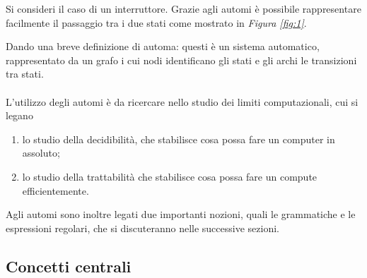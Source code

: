 \documentclass{subfiles}
\begin{document}
Si consideri il caso di un interruttore. Grazie agli automi è possibile rappresentare facilmente il passaggio tra i due stati come mostrato in \emph{Figura \eqref{fig:1}}.
 \label{sec:1}

\noindent Dando una breve definizione di automa: questi è un sistema automatico, rappresentato da un grafo i cui nodi identificano gli stati e gli archi le transizioni tra stati.
\\ \\
L'utilizzo degli automi è da ricercare nello studio dei limiti computazionali, cui si legano
\begin{enumerate}
    \item lo studio della decidibilità, che stabilisce cosa possa fare un computer in assoluto;
    \item lo studio della trattabilità che stabilisce cosa possa fare un compute efficientemente.
\end{enumerate}

\noindent Agli automi sono inoltre legati due importanti nozioni, quali le grammatiche e le espressioni regolari, che si discuteranno nelle successive sezioni.

\subsection{Concetti centrali}

\end{document}
